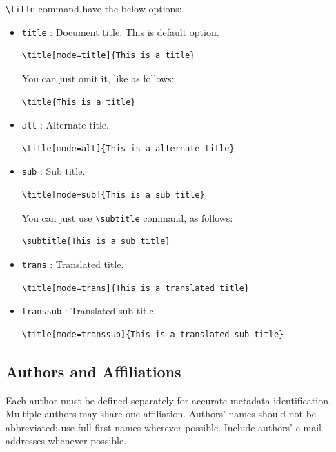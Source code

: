 \documentclass[%
]{ceurart}
\begin{document}
\verb|\title|
command have the below options:
\begin{itemize}
\item
\verb|title|
: Document title. This is default option.
\begin{lstlisting}[language={[latex]TeX}]
\title[mode=title]{This is a title}
\end{lstlisting}

You can just omit it, like as follows:
\begin{lstlisting}[language={[latex]TeX}]
\title{This is a title}
\end{lstlisting}

\item
\verb|alt|
: Alternate title.
\begin{lstlisting}[language={[latex]TeX}]
\title[mode=alt]{This is a alternate title}
\end{lstlisting}

\item
\verb|sub|
: Sub title.
\begin{lstlisting}[language={[latex]TeX}]
\title[mode=sub]{This is a sub title}
\end{lstlisting}
You can just use
\verb|\subtitle|
 command, as follows:
\begin{lstlisting}[language={[latex]TeX}]
\subtitle{This is a sub title}
\end{lstlisting}

\item
\verb|trans|
: Translated title.
\begin{lstlisting}[language={[latex]TeX}]
\title[mode=trans]{This is a translated title}
\end{lstlisting}

\item
\verb|transsub|
: Translated sub title.
\begin{lstlisting}[language={[latex]TeX}]
\title[mode=transsub]{This is a translated sub title}
\end{lstlisting}
\end{itemize}

\subsection{Authors and Affiliations}

Each author must be defined separately for accurate metadata identification.
Multiple authors may share one affiliation.
Authors' names should not be abbreviated; use full first names wherever possible.
Include authors' e-mail addresses whenever possible.
\end{document}
